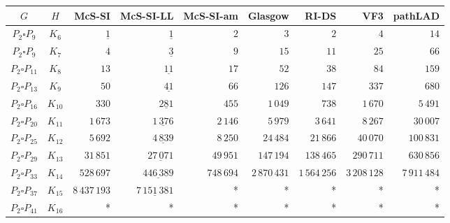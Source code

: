 
\begin{tabular}{ccrrrrrrr}
    \toprule
    {$G$} & {$H$} & {McS-SI} & {McS-SI-LL} & {McS-SI-am} & Glasgow & RI-DS & VF3 & pathLAD \\ 
    \midrule

$P_2\square P_{9}$ & $K_{6}$ & $\underline{1}$ & $\underline{1}$ & $2$ & $3$ & $2$ & $4$ & $14$\\
$P_2\square P_{9}$ & $K_{7}$ & $4$ & $\underline{3}$ & $9$ & $15$ & $11$ & $25$ & $66$\\
$P_2\square P_{11}$ & $K_{8}$ & $13$ & $\underline{11}$ & $17$ & $52$ & $38$ & $84$ & $159$\\
$P_2\square P_{13}$ & $K_{9}$ & $50$ & $\underline{41}$ & $66$ & $126$ & $147$ & $337$ & $680$\\
$P_2\square P_{16}$ & $K_{10}$ & $330$ & $\underline{281}$ & $455$ & $1\,049$ & $738$ & $1\,670$ & $5\,491$\\
$P_2\square P_{20}$ & $K_{11}$ & $1\,673$ & $\underline{1\,376}$ & $2\,146$ & $5\,979$ & $3\,641$ & $8\,267$ & $30\,007$\\
$P_2\square P_{25}$ & $K_{12}$ & $5\,692$ & $\underline{4\,839}$ & $8\,250$ & $24\,484$ & $21\,866$ & $40\,070$ & $100\,831$\\
$P_2\square P_{29}$ & $K_{13}$ & $31\,851$ & $\underline{27\,071}$ & $49\,951$ & $147\,194$ & $138\,465$ & $290\,711$ & $630\,856$\\
$P_2\square P_{33}$ & $K_{14}$ & $528\,697$ & $\underline{446\,389}$ & $748\,694$ & $2\,870\,431$ & $1\,564\,256$ & $3\,208\,128$ & $7\,911\,484$\\
$P_2\square P_{37}$ & $K_{15}$ & $8\,437\,193$ & $\underline{7\,151\,381}$ & * & * & * & * & *\\
$P_2\square P_{41}$ & $K_{16}$ & * & * & * & * & * & * & *\\

    \bottomrule
\end{tabular}


